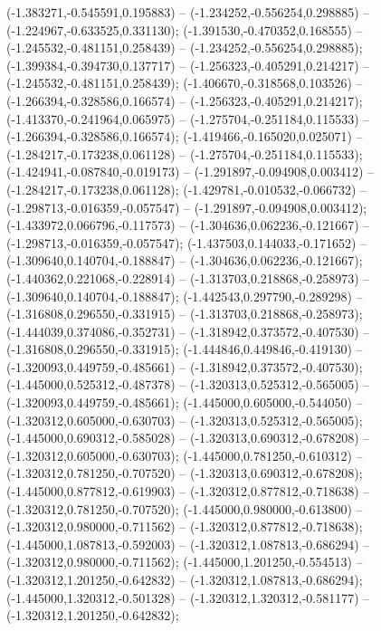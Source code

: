  (-1.383271,-0.545591,0.195883) -- (-1.234252,-0.556254,0.298885) -- (-1.224967,-0.633525,0.331130);
 (-1.391530,-0.470352,0.168555) -- (-1.245532,-0.481151,0.258439) -- (-1.234252,-0.556254,0.298885);
 (-1.399384,-0.394730,0.137717) -- (-1.256323,-0.405291,0.214217) -- (-1.245532,-0.481151,0.258439);
 (-1.406670,-0.318568,0.103526) -- (-1.266394,-0.328586,0.166574) -- (-1.256323,-0.405291,0.214217);
 (-1.413370,-0.241964,0.065975) -- (-1.275704,-0.251184,0.115533) -- (-1.266394,-0.328586,0.166574);
 (-1.419466,-0.165020,0.025071) -- (-1.284217,-0.173238,0.061128) -- (-1.275704,-0.251184,0.115533);
 (-1.424941,-0.087840,-0.019173) -- (-1.291897,-0.094908,0.003412) -- (-1.284217,-0.173238,0.061128);
 (-1.429781,-0.010532,-0.066732) -- (-1.298713,-0.016359,-0.057547) -- (-1.291897,-0.094908,0.003412);
 (-1.433972,0.066796,-0.117573) -- (-1.304636,0.062236,-0.121667) -- (-1.298713,-0.016359,-0.057547);
 (-1.437503,0.144033,-0.171652) -- (-1.309640,0.140704,-0.188847) -- (-1.304636,0.062236,-0.121667);
 (-1.440362,0.221068,-0.228914) -- (-1.313703,0.218868,-0.258973) -- (-1.309640,0.140704,-0.188847);
 (-1.442543,0.297790,-0.289298) -- (-1.316808,0.296550,-0.331915) -- (-1.313703,0.218868,-0.258973);
 (-1.444039,0.374086,-0.352731) -- (-1.318942,0.373572,-0.407530) -- (-1.316808,0.296550,-0.331915);
 (-1.444846,0.449846,-0.419130) -- (-1.320093,0.449759,-0.485661) -- (-1.318942,0.373572,-0.407530);
 (-1.445000,0.525312,-0.487378) -- (-1.320313,0.525312,-0.565005) -- (-1.320093,0.449759,-0.485661);
 (-1.445000,0.605000,-0.544050) -- (-1.320312,0.605000,-0.630703) -- (-1.320313,0.525312,-0.565005);
 (-1.445000,0.690312,-0.585028) -- (-1.320313,0.690312,-0.678208) -- (-1.320312,0.605000,-0.630703);
 (-1.445000,0.781250,-0.610312) -- (-1.320312,0.781250,-0.707520) -- (-1.320313,0.690312,-0.678208);
 (-1.445000,0.877812,-0.619903) -- (-1.320312,0.877812,-0.718638) -- (-1.320312,0.781250,-0.707520);
 (-1.445000,0.980000,-0.613800) -- (-1.320312,0.980000,-0.711562) -- (-1.320312,0.877812,-0.718638);
 (-1.445000,1.087813,-0.592003) -- (-1.320312,1.087813,-0.686294) -- (-1.320312,0.980000,-0.711562);
 (-1.445000,1.201250,-0.554513) -- (-1.320312,1.201250,-0.642832) -- (-1.320312,1.087813,-0.686294);
 (-1.445000,1.320312,-0.501328) -- (-1.320312,1.320312,-0.581177) -- (-1.320312,1.201250,-0.642832);
